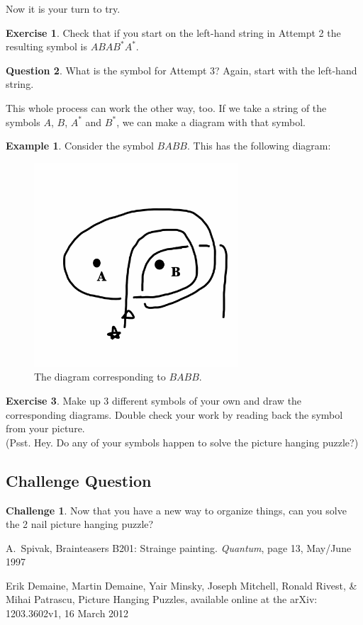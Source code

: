 \documentclass[12pt,letterpaper]{article}
\theoremstyle{definition}
\newtheorem{question}{Question}
\newtheorem{example}{Example}
\newtheorem{exercise}[question]{Exercise}
\newtheorem*{challenge}{Challenge}
\begin{document}
Now it is your turn to try.
\begin{exercise}
Check that if you start on the left-hand string in Attempt 2 the resulting symbol is $ABAB^*A^*$.
\end{exercise}

\begin{question}
What is the symbol for Attempt 3? Again, start with the left-hand string.
\end{question}

This whole process can work the other way, too.
If we take a string of the symbols $A$, $B$, $A^*$ and $B^*$, we can make a diagram with that symbol.
\begin{example} 
Consider the symbol $BABB$.
This has the following diagram:
\begin{figure}[h]
    \centering
    \includegraphics[height=3in]{rgp01pics/code2diagr.png}
    \caption{The diagram corresponding to $BABB$.}
\end{figure}
\end{example}

\begin{exercise} Make up 3 different symbols of your own and draw the corresponding diagrams.
Double check your work by reading back the symbol from your picture.\\
(Psst. Hey. Do any of your symbols happen to solve the picture hanging puzzle?)
\end{exercise}

\subsection*{Challenge Question}

\begin{challenge}
Now that you have a new way to organize things, can you solve the 2 nail picture hanging puzzle?
\end{challenge}

\begin{thebibliography}{9}

    A.~Spivak,
    Brainteasers B201: Strainge painting.
    \emph{Quantum}, page 13,
    May/June 1997

    Erik Demaine, Martin Demaine, Yair Minsky, Joseph Mitchell, Ronald Rivest, \& Mihai Patrascu,
    Picture Hanging Puzzles,
    available online at the arXiv: 1203.3602v1,
    16 March 2012
 
 \end{thebibliography}
\end{document}
